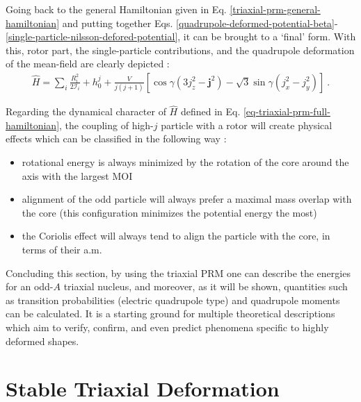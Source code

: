 Going back to the general Hamiltonian given in Eq. \ref{triaxial-prm-general-hamiltonian} and putting together Eqs. \ref{quadrupole-deformed-potential-beta}-\ref{single-particle-nilsson-defored-potential}, it can be brought to a `final' form. With this, rotor part, the single-particle contributions, and the quadrupole deformation of the mean-field are clearly depicted \cite{ring2004nuclear}:
\begin{align}
    \hat{H}=\sum_i\frac{R_i^2}{2\mathcal{I}_i}+h_0^j+\frac{V}{j(j+1)}\left[\cos\gamma(3j_z^2-\mathbf{j}^2)-\sqrt{3}\sin\gamma(j_x^2-j_y^2)\right]\ .
    \label{eq-triaxial-prm-full-hamiltonian}
\end{align}

Regarding the dynamical character of $\hat{H}$ defined in Eq. \ref{eq-triaxial-prm-full-hamiltonian}, the coupling of high-$j$ particle with a rotor will create physical effects which can be classified in the following way \cite{ring2004nuclear}:
\begin{itemize}
    \item rotational energy is always minimized by the rotation of the core around the axis with the largest MOI
    \item alignment of the odd particle will always prefer a maximal mass overlap with the core (this configuration minimizes the potential energy the most)
    \item the Coriolis effect will always tend to align the particle with the core, in terms of their a.m.
\end{itemize}

Concluding this section, by using the triaxial PRM one can describe the energies for an odd-$A$ triaxial nucleus, and moreover, as it will be shown, quantities such as transition probabilities (electric quadrupole type) and quadrupole moments can be calculated. It is a starting ground for multiple theoretical descriptions which aim to verify, confirm, and even predict phenomena specific to highly deformed shapes.

\section{Stable Triaxial Deformation}
\label{potential-energy-surfaces-section}

